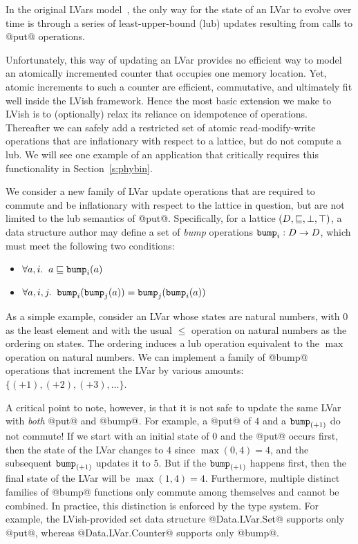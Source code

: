 In the original LVars model~\cite{LVars-paper,Freeze-paper}, the only
way for the state of an LVar to evolve over time is through a series
of least-upper-bound (lub) updates resulting from calls to @put@
operations.

Unfortunately, this way of updating an LVar provides no efficient way
to model an atomically incremented counter that occupies one memory
location.  Yet, atomic increments to such a counter are efficient,
commutative, and ultimately fit well inside the LVish framework.
Hence the most basic extension we make to LVish is to (optionally)
relax its reliance on idempotence of operations.  Thereafter we can
safely add a restricted set of atomic read-modify-write operations
that are inflationary with respect to a lattice, but do not compute a
lub.   We will see one example of an application that
critically requires this functionality in Section~\ref{s:phybin}.

We consider a new family of LVar update operations that are required
to commute and be inflationary with respect to the lattice in
question, but are not limited to the lub semantics of @put@.
Specifically, for a lattice $(D,\sqsubseteq,\bot, \top)$, a data
structure author may define a set of {\em bump} operations $\mbox{\texttt{bump}}_i :
D \rightarrow D$, which must meet the following two conditions:
\begin{itemize}
\item $\forall a, i.     \;\; a \sqsubseteq \mbox{\texttt{bump}}_i(a) $
\item $\forall a, i, j.  \;\; \mbox{\texttt{bump}}_i(\mbox{\texttt{bump}}_j(a)) = \mbox{\texttt{bump}}_j(\mbox{\texttt{bump}}_i(a)) $
\end{itemize}
As a simple example, consider an LVar whose states are natural
numbers, with $0$ as the least element and with the usual $\leq$
operation on natural numbers as the ordering on states.  The ordering
induces a lub operation equivalent to the $\max$ operation on natural
numbers.  We can implement a family of @bump@ operations that
increment the LVar by various amounts: $\{ (+1), (+2), (+3), \dots
\}$.

A critical point to note, however, is that it is not safe to update
the same LVar with {\em both} @put@ and @bump@.  For example, a @put@
of $4$ and a $\mbox{\texttt{bump}}_{(+1)}$ do not commute!  If we start with an
initial state of $0$ and the @put@ occurs first, then the state of the
LVar changes to $4$ since $\max(0, 4) = 4$, and the subsequent
$\mbox{\texttt{bump}}_{(+1)}$ updates it to $5$.  But if the $\mbox{\texttt{bump}}_{(+1)}$ happens
first, then the final state of the LVar will be $\max(1, 4) = 4$.
{Furthermore, multiple distinct families of @bump@ functions only
  commute among themselves and cannot be combined.}  In practice, this
distinction is enforced by the type system. For example, the
LVish-provided set data structure @Data.LVar.Set@ supports only @put@,
whereas @Data.LVar.Counter@ supports only @bump@.

